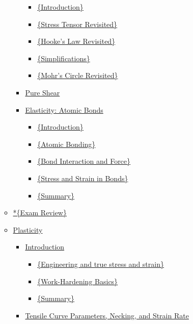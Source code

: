 \documentclass[
]{article}
\providecommand{\tightlist}{%
  \setlength{\itemsep}{0pt}\setlength{\parskip}{0pt}}
\begin{document}
\begin{itemize}
\begin{itemize}
\begin{itemize}
      \begin{itemize}
      \tightlist
      \item
        \protect\hyperlink{introduction-2}{\{Introduction\}}
      \item
        \protect\hyperlink{stress-tensor-revisited}{\{Stress Tensor
        Revisited\}}
      \item
        \protect\hyperlink{hookes-law-revisited}{\{Hooke's Law
        Revisited\}}
      \item
        \protect\hyperlink{simplifications}{\{Simplifications\}}
      \item
        \protect\hyperlink{mohrs-circle-revisited}{\{Mohr's Circle
        Revisited\}}
      \end{itemize}
    \item
      \protect\hyperlink{pure-shear}{Pure Shear}
    \item
      \protect\hyperlink{elasticity-atomic-bonds}{Elasticity: Atomic
      Bonds}

      \begin{itemize}
      \tightlist
      \item
        \protect\hyperlink{introduction-3}{\{Introduction\}}
      \item
        \protect\hyperlink{atomic-bonding}{\{Atomic Bonding\}}
      \item
        \protect\hyperlink{bond-interaction-and-force}{\{Bond
        Interaction and Force\}}
      \item
        \protect\hyperlink{stress-and-strain-in-bonds}{\{Stress and
        Strain in Bonds\}}
      \item
        \protect\hyperlink{summary-2}{\{Summary\}}
      \end{itemize}
    \end{itemize}
  \item
    \protect\hyperlink{exam-review}{*\{Exam Review\}}
  \item
    \protect\hyperlink{plasticity}{Plasticity}

    \begin{itemize}
    \tightlist
    \item
      \protect\hyperlink{introduction-4}{Introduction}

      \begin{itemize}
      \tightlist
      \item
        \protect\hyperlink{engineering-and-true-stress-and-strain}{\{Engineering
        and true stress and strain\}}
      \item
        \protect\hyperlink{work-hardening-basics}{\{Work-Hardening
        Basics\}}
      \item
        \protect\hyperlink{summary-3}{\{Summary\}}
      \end{itemize}
    \item
      \protect\hyperlink{tensile-curve-parameters-necking-and-strain-rate}{Tensile
      Curve Parameters, Necking, and Strain Rate}


\end{itemize}
\end{itemize}
\end{itemize}
\end{document}
